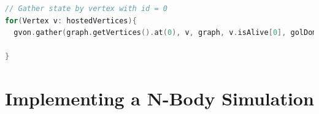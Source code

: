 \begin{lstlisting}[language=C++, label=lst:gol_gather, caption={\ } ]
// Gather state by vertex with id = 0
for(Vertex v: hostedVertices){
  gvon.gather(graph.getVertices().at(0), v, graph, v.isAlive[0], golDomain);

}
\end{lstlisting}


\section{Implementing a N-Body Simulation}
\label{sec:impl:nbody}
